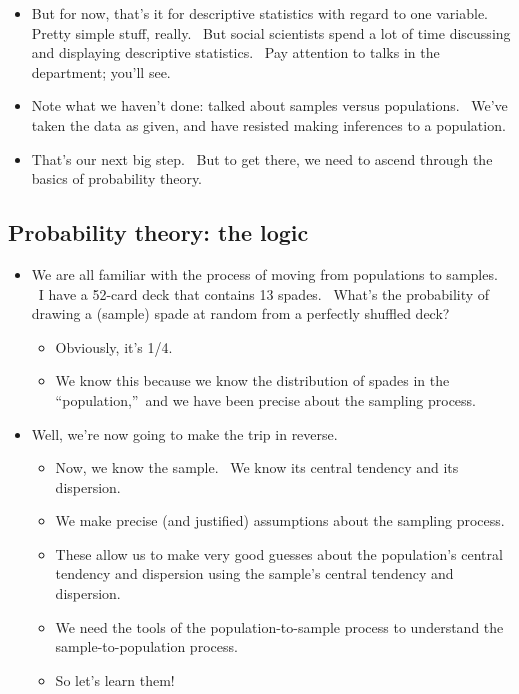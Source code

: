 \documentclass[11pt]{article}
\begin{document}
\begin{itemize}
\begin{itemize}
\item But for now, that's it for descriptive statistics with regard to one
variable. Pretty simple stuff, really. \ But social scientists spend a lot
of time discussing and displaying descriptive statistics. \ Pay attention to
talks in the department; you'll see. \ 

\item Note what we haven't done: talked about samples versus populations. \
We've taken the data as given, and have resisted making inferences to a
population.

\item That's our next big step. \ But to get there, we need to ascend
through the basics of probability theory.
\end{itemize}
\end{itemize}

\subsection{Probability theory: the logic}

\begin{itemize}
\item We are all familiar with the process of moving from populations to
samples. \ I have a 52-card deck that contains 13 spades. \ What's the
probability of drawing a (sample) spade at random from a perfectly shuffled
deck?

\begin{itemize}
\item Obviously, it's 1/4.

\item We know this because we know the distribution of spades in the
\textquotedblleft population,\textquotedblright\ and we have been precise
about the sampling process.
\end{itemize}

\item Well, we're now going to make the trip in reverse. \ 

\begin{itemize}
\item Now, we know the sample. \ We know its central tendency and its
dispersion.

\item We make precise (and justified) assumptions about the sampling process.

\item These allow us to make very good guesses about the population's
central tendency and dispersion using the sample's central tendency and
dispersion.

\item We need the tools of the population-to-sample process to understand
the sample-to-population process.

\item So let's learn them!
\end{itemize}
\end{itemize}
\end{document}
